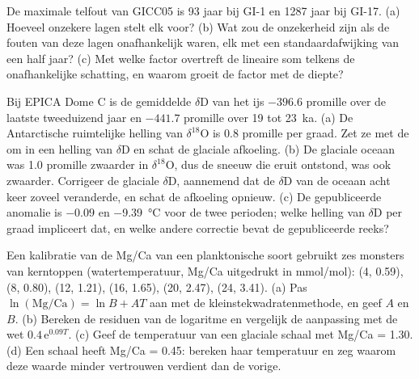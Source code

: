 \begin{exercise}[$\star\star$]\label{exo:b2:climate-proxies:9}
De maximale telfout van GICC05 is 93 jaar bij GI-1 en \num{1287} jaar bij GI-17. (a) Hoeveel
onzekere lagen stelt elk voor? (b) Wat zou de onzekerheid zijn als de fouten van deze
lagen onafhankelijk waren, elk met een standaardafwijking van een half jaar? (c) Met welke factor overtreft de
lineaire som telkens de onafhankelijke schatting, en waarom groeit de factor met de diepte?
\end{exercise}

\begin{exercise}[$\star\star\star$]\label{exo:b2:climate-proxies:10}
Bij EPICA Dome C is de gemiddelde $\delta$D van het ijs $-396.6$ promille over de laatste tweeduizend jaar
en $-441.7$ promille over 19 tot \qty{23}{ka}. (a) De Antarctische ruimtelijke helling van $\delta^{18}$O is
\num{0.8} promille per graad. Zet ze met de  om in een helling van $\delta$D en
schat de glaciale afkoeling. (b) De glaciale oceaan was \num{1.0} promille zwaarder in
$\delta^{18}$O, dus de sneeuw die eruit ontstond, was ook zwaarder. Corrigeer de glaciale $\delta$D, aannemend dat de $\delta$D van de oceaan
acht keer zoveel veranderde, en schat de afkoeling opnieuw.
(c) De gepubliceerde anomalie is $-0.09$ en \qty{-9.39}{\celsius} voor de twee perioden; welke helling van
$\delta$D per graad impliceert dat, en welke andere correctie bevat de gepubliceerde reeks?
\end{exercise}

\begin{exercise}[$\star\star\star$]\label{exo:b2:climate-proxies:11}
Een kalibratie van de Mg/Ca van een planktonische soort gebruikt zes monsters van kerntoppen (watertemperatuur,
Mg/Ca uitgedrukt in \unit{mmol/mol}): (4, 0.59), (8, 0.80), (12, 1.21), (16, 1.65), (20, 2.47), (24, 3.41).
(a) Pas $\ln(\text{Mg/Ca}) = \ln B + AT$ aan met de kleinstekwadratenmethode, en geef $A$ en $B$. (b) Bereken de
residuen van de logaritme en vergelijk de aanpassing met de wet $0.4\,\mathrm{e}^{0.09T}$. (c) Geef de
temperatuur van een glaciale schaal met Mg/Ca = 1.30. (d) Een schaal heeft Mg/Ca = 0.45: bereken haar
temperatuur en zeg waarom deze waarde minder vertrouwen verdient dan de vorige.
\end{exercise}

